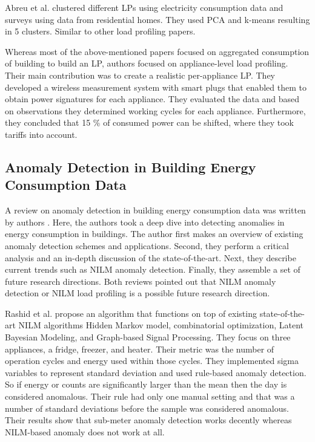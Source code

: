 Abreu et al.\cite{Joana2012} clustered different LPs using electricity consumption data and surveys using data from residential homes.
They used PCA and k-means resulting in 5 clusters. Similar to other load profiling papers. 

Whereas most of the above-mentioned papers focused on aggregated consumption of building to build an LP,
authors \cite{Issi2018} focused on appliance-level load profiling.
Their main contribution was to create a realistic per-appliance LP.
They developed a wireless measurement system with smart plugs that enabled them to obtain power signatures for each appliance. 
They evaluated the data and based on observations they determined working cycles for each appliance.
Furthermore, they concluded that 15 \% of consumed power can be shifted, where they took tariffs into account. 

\subsection{Anomaly Detection in Building Energy Consumption Data}

A review on anomaly detection in building energy consumption data was written by authors \cite{HIMEUR2021116601}.
Here, the authors took a deep dive into detecting anomalies in energy consumption in buildings. 
The author first makes an overview of existing anomaly detection schemes and applications.
Second, they perform a critical analysis and an in-depth discussion of the state-of-the-art.
Next, they describe current trends such as NILM anomaly detection. Finally, they assemble a set of future research directions. 
Both reviews pointed out that NILM anomaly detection or NILM load profiling is a possible future research direction.

Rashid et al.\cite{NILMAD2019} propose an algorithm
that functions on top of existing state-of-the-art NILM algorithms Hidden Markov model,
combinatorial optimization, Latent Bayesian Modeling, and Graph-based Signal Processing.
They focus on three appliances, a fridge, freezer, and heater. Their metric was the number of operation cycles and energy used within those cycles. 
They implemented sigma variables to represent standard deviation and used rule-based anomaly detection.
So if energy or counts are significantly larger than the mean then the day is considered anomalous.
Their rule had only one manual setting and that was a number of standard deviations before the sample was considered anomalous.
Their results show that sub-meter anomaly detection works decently whereas NILM-based anomaly does not work at all. 

